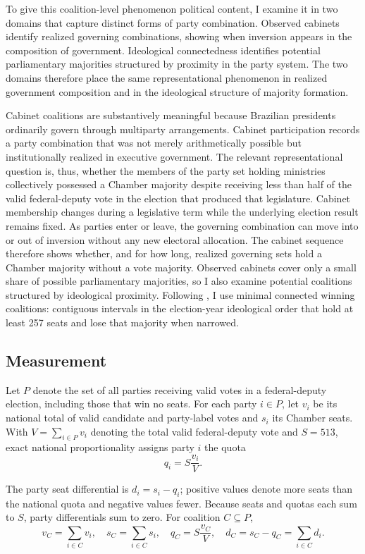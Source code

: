 \documentclass[11pt]{article}
\begin{document}
To give this coalition-level phenomenon political content, I examine it in two
domains that capture distinct forms of party combination. Observed cabinets
identify realized governing combinations, showing when inversion appears in the
composition of government. Ideological connectedness identifies potential
parliamentary majorities structured by proximity in the party system. The two
domains therefore place the same representational phenomenon in realized
government composition and in the ideological structure of majority formation.

Cabinet coalitions are substantively meaningful because Brazilian presidents
ordinarily govern through multiparty arrangements. Cabinet participation records
a party combination that was not merely arithmetically possible but
institutionally realized in executive government. The relevant representational
question is, thus, whether the members of the party set holding ministries
collectively possessed a Chamber majority despite receiving less than half of
the valid federal-deputy vote in the election that produced that legislature.
Cabinet membership changes during a legislative term while the underlying
election result remains fixed. As parties enter or leave, the governing
combination can move into or out of inversion without any new electoral
allocation. The cabinet sequence therefore shows whether, and for how long,
realized governing sets hold a Chamber majority without a vote majority.
Observed cabinets cover only a small share of possible parliamentary majorities,
so I also examine potential coalitions structured by ideological proximity.
Following \textcite{axelrod1970conflict}, I use minimal connected winning coalitions: contiguous intervals
in the election-year ideological order that hold at least 257 seats and lose
that majority when narrowed.


\subsection{Measurement }

Let \(P\) denote the set of all parties receiving valid votes in a
federal-deputy election, including those that win no seats. For each party \(i\in P\),
let \(v_i\) be its national total of valid candidate and party-label
votes and \(s_i\) its Chamber seats. With \(V=\sum_{i\in P}v_i\) denoting
the total valid federal-deputy vote and \(S=513\), exact national
proportionality assigns party \(i\) the quota
\[
q_i=S\frac{v_i}{V}.
\]

The party seat differential is $d_i=s_i-q_i$; positive values denote
more seats than the national quota and negative values fewer. Because seats and
quotas each sum to $S$, party differentials sum to zero. For coalition
$C\subseteq P$,
\[
v_C=\sum_{i\in C}v_i,\quad s_C=\sum_{i\in C}s_i,\quad
q_C=S\frac{v_C}{V},\quad d_C=s_C-q_C=\sum_{i\in C}d_i.
\]
\end{document}

